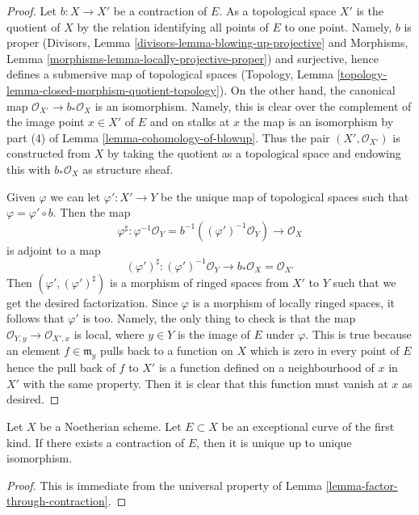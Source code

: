 \begin{proof}
Let $b : X \to X'$ be a contraction of $E$. As a topological space
$X'$ is the quotient of $X$ by the relation identifying all points
of $E$ to one point. Namely, $b$ is proper
(Divisors, Lemma \ref{divisors-lemma-blowing-up-projective} and
Morphisms, Lemma \ref{morphisms-lemma-locally-projective-proper})
and surjective, hence defines a submersive map of topological
spaces (Topology, Lemma
\ref{topology-lemma-closed-morphism-quotient-topology}).
On the other hand, the canonical map
$\mathcal{O}_{X'} \to b_*\mathcal{O}_X$ is an isomorphism. Namely,
this is clear over the complement of the image point $x \in X'$ of $E$
and on stalks at $x$ the map is an isomorphism by part (4) of
Lemma \ref{lemma-cohomology-of-blowup}.
Thus the pair $(X', \mathcal{O}_{X'})$ is constructed
from $X$ by taking the quotient as a topological space
and endowing this with $b_*\mathcal{O}_X$ as structure sheaf.

\medskip\noindent
Given $\varphi$ we can let $\varphi' : X' \to Y$ be the unique map of
topological spaces such that $\varphi = \varphi' \circ b$.
Then the map
$$
\varphi^\sharp : \varphi^{-1}\mathcal{O}_Y =
b^{-1}((\varphi')^{-1}\mathcal{O}_Y) \to \mathcal{O}_X
$$
is adjoint to a map
$$
(\varphi')^\sharp :
(\varphi')^{-1}\mathcal{O}_Y \to b_*\mathcal{O}_X = \mathcal{O}_{X'}
$$
Then $(\varphi', (\varphi')^\sharp)$ is a morphism of ringed spaces
from $X'$ to $Y$ such that we get the desired factorization. Since
$\varphi$ is a morphism of locally ringed spaces, it follows that
$\varphi'$ is too. Namely, the only thing to check is that the map
$\mathcal{O}_{Y, y} \to \mathcal{O}_{X', x}$ is local, where $y \in Y$
is the image of $E$ under $\varphi$. This is true because an element
$f \in \mathfrak m_y$ pulls back to a function on $X$ which is zero
in every point of $E$ hence the pull back of $f$ to $X'$ is a function
defined on a neighbourhood of $x$ in $X'$ with the same property.
Then it is clear that this function must vanish at $x$ as desired.
\end{proof}

\begin{lemma}
\label{lemma-contraction-unique}
Let $X$ be a Noetherian scheme. Let $E \subset X$ be an
exceptional curve of the first kind. If there exists a contraction
of $E$, then it is unique up to unique isomorphism.
\end{lemma}

\begin{proof}
This is immediate from the universal property of
Lemma \ref{lemma-factor-through-contraction}.
\end{proof}

